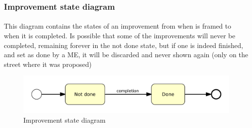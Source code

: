 				\subsubsection{Improvement state diagram}
					\paragraph{}
						This diagram contains the states of an improvement from when is framed to when it is completed. Is possible that some of the improvements will never be completed, remaining forever in the not done state, but if one is indeed finished, and set as done by a ME, it will be discarded and never shown again (only on the street where it was proposed)
					\begin{figure}[htbp]
  							\includegraphics[width=\textwidth]{images/StateDiagram/ImprovementStateDiagram.pdf}
  							\centering
  							\caption{Improvement state diagram}
						\end{figure}
			\clearpage
